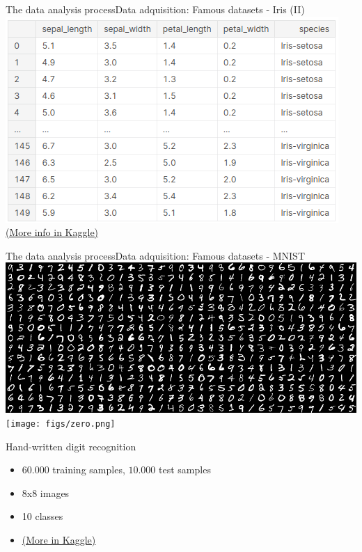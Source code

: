 \documentclass[10pt,compress]{beamer} %
\begin{document}
\begin{frame}{The data analysis process}{Data adquisition: Famous datasets - Iris (II)}
	\centering
    \includegraphics[width=0.6\linewidth]{figs/iris-head.png}\\
    \bigskip
    \href{https://www.kaggle.com/datasets/arshid/iris-flower-dataset}{(More info in Kaggle)}
\end{frame}

\begin{frame}{The data analysis process}{Data adquisition: Famous datasets - MNIST}
	\includegraphics[width=0.8\linewidth]{figs/mnist.png} \texttt{[image: figs/zero.png]}

	Hand-written digit recognition
		\begin{itemize}
		\item $60.000$ training samples, $10.000$ test samples
        \item 8x8 images
        \item 10 classes
        \item \href{https://www.kaggle.com/datasets/hojjatk/mnist-dataset}{(More in Kaggle)}
		\end{itemize}
\end{frame}
\end{document}
